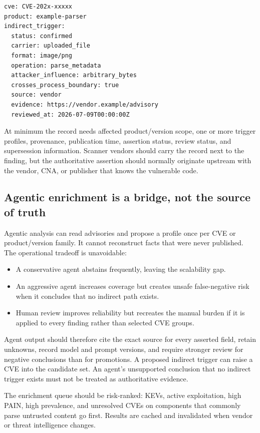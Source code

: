 \documentclass[11pt]{article}
\begin{document}
\begin{verbatim}
cve: CVE-202x-xxxxx
product: example-parser
indirect_trigger:
  status: confirmed
  carrier: uploaded_file
  format: image/png
  operation: parse_metadata
  attacker_influence: arbitrary_bytes
  crosses_process_boundary: true
  source: vendor
  evidence: https://vendor.example/advisory
  reviewed_at: 2026-07-09T00:00:00Z
\end{verbatim}

At minimum the record needs affected product/version scope, one or more
trigger profiles, provenance, publication time, assertion status, review
status, and supersession information. Scanner vendors should carry the record
next to the finding, but the authoritative assertion should normally originate
upstream with the vendor, CNA, or publisher that knows the vulnerable code.

\subsection{Agentic enrichment is a bridge, not the source of truth}
Agentic analysis can read advisories and propose a profile once per CVE or
product/version family. It cannot reconstruct facts that were never published.
The operational tradeoff is unavoidable:

\begin{itemize}[leftmargin=1.5em]
\item A conservative agent abstains frequently, leaving the scalability gap.
\item An aggressive agent increases coverage but creates unsafe false-negative
  risk when it concludes that no indirect path exists.
\item Human review improves reliability but recreates the manual burden if it
  is applied to every finding rather than selected CVE groups.
\end{itemize}

Agent output should therefore cite the exact source for every asserted field,
retain unknowns, record model and prompt versions, and require stronger review
for negative conclusions than for promotions. A proposed indirect trigger can
raise a CVE into the candidate set. An agent's unsupported conclusion that no
indirect trigger exists must not be treated as authoritative evidence.

The enrichment queue should be risk-ranked: KEVs, active exploitation, high
PAIN, high prevalence, and unresolved CVEs on components that commonly parse
untrusted content go first. Results are cached and invalidated when vendor or
threat intelligence changes.
\end{document}
